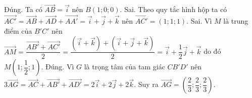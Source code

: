 \begin{ex}
{\begin{itemchoice}
			\itemch Đúng. Ta có $\overrightarrow{AB}=\overrightarrow{i}$  nên $B(1;0;0)$.
			\itemch Sai. Theo quy tắc hình hộp ta có $\overrightarrow{AC'}=\overrightarrow{AB}+\overrightarrow{AD}+\overrightarrow{AA'}=\overrightarrow{i}+\overrightarrow{j}+\overrightarrow{k}$ nên $\overrightarrow{AC'}=(1;1;1)$.
			\itemch Sai. Vì $M$ là trung điểm của $B'C'$ nên $\overrightarrow{AM}=\dfrac{\overrightarrow{AB'}+\overrightarrow{AC'}}{2}=\dfrac{(\overrightarrow{i}+\overrightarrow{k})+(\overrightarrow{i}+\overrightarrow{j}+\overrightarrow{k})}{2}=\overrightarrow{i}+\dfrac{1}{2}\overrightarrow{j}+\overrightarrow{k}$ do đó $M\left(1;\dfrac{1}{2};1\right)$.
			\itemch Đúng. Vì $G$ là trọng tâm của tam giác $CB'D'$  nên 
			$3\overrightarrow{AG}=\overrightarrow{AC}+\overrightarrow{AB'}+\overrightarrow{AD'}=2\overrightarrow{i}+2\overrightarrow{j}+2\overrightarrow{k}$. Suy ra $\overrightarrow{AG}=\left(\dfrac{2}{3};\dfrac{2}{3};\dfrac{2}{3}\right)$.
			
		\end{itemchoice}
	}
\end{ex}

